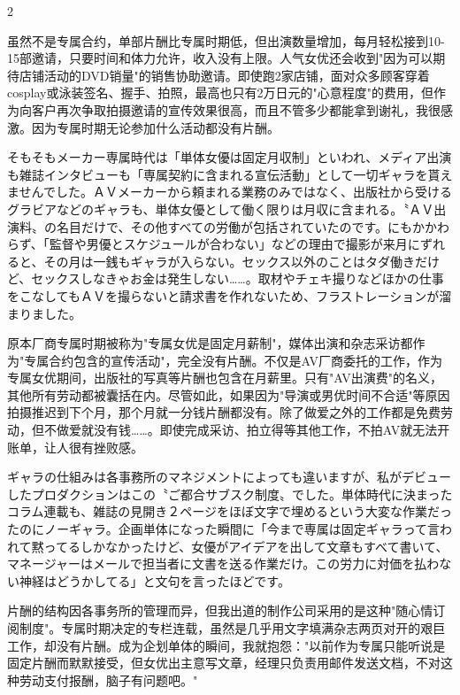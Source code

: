\documentclass[12pt,UTF8]{ctexbook}
\begin{document}
\begin{paracol}{2}
\switchcolumn

虽然不是专属合约，单部片酬比专属时期低，但出演数量增加，每月轻松接到10-15部邀请，只要时间和体力允许，收入没有上限。人气女优还会收到"因为可以期待店铺活动的DVD销量"的销售协助邀请。即使跑2家店铺，面对众多顾客穿着cosplay或泳装签名、握手、拍照，最高也只有2万日元的"心意程度"的费用，但作为向客户再次争取拍摄邀请的宣传效果很高，而且不管多少都能拿到谢礼，我很感激。因为专属时期无论参加什么活动都没有片酬。

\switchcolumn*

そもそもメーカー専属時代は「単体女優は固定月収制」といわれ、メディア出演も雑誌インタビューも「専属契約に含まれる宣伝活動」として一切ギャラを貰えませんでした。ＡＶメーカーから頼まれる業務のみではなく、出版社から受けるグラビアなどのギャラも、単体女優として働く限りは月収に含まれる。〝ＡＶ出演料〟の名目だけで、その他すべての労働が包括されていたのです。にもかかわらず、「監督や男優とスケジュールが合わない」などの理由で撮影が来月にずれると、その月は一銭もギャラが入らない。セックス以外のことはタダ働きだけど、セックスしなきゃお金は発生しない……。取材やチェキ撮りなどほかの仕事をこなしてもＡＶを撮らないと請求書を作れないため、フラストレーションが溜まりました。

\switchcolumn

原本厂商专属时期被称为"专属女优是固定月薪制"，媒体出演和杂志采访都作为"专属合约包含的宣传活动"，完全没有片酬。不仅是AV厂商委托的工作，作为专属女优期间，出版社的写真等片酬也包含在月薪里。只有"AV出演费"的名义，其他所有劳动都被囊括在内。尽管如此，如果因为"导演或男优时间不合适"等原因拍摄推迟到下个月，那个月就一分钱片酬都没有。除了做爱之外的工作都是免费劳动，但不做爱就没有钱……。即使完成采访、拍立得等其他工作，不拍AV就无法开账单，让人很有挫败感。

\switchcolumn*

ギャラの仕組みは各事務所のマネジメントによっても違いますが、私がデビューしたプロダクションはこの〝ご都合サブスク制度〟でした。単体時代に決まったコラム連載も、雑誌の見開き２ページをほぼ文字で埋めるという大変な作業だったのにノーギャラ。企画単体になった瞬間に「今まで専属は固定ギャラって言われて黙ってるしかなかったけど、女優がアイデアを出して文章もすべて書いて、マネージャーはメールで担当者に文書を送る作業だけ。この労力に対価を払わない神経はどうかしてる」と文句を言ったほどです。

\switchcolumn

片酬的结构因各事务所的管理而异，但我出道的制作公司采用的是这种"随心情订阅制度"。专属时期决定的专栏连载，虽然是几乎用文字填满杂志两页对开的艰巨工作，却没有片酬。成为企划单体的瞬间，我就抱怨："以前作为专属只能听说是固定片酬而默默接受，但女优出主意写文章，经理只负责用邮件发送文档，不对这种劳动支付报酬，脑子有问题吧。"


\end{paracol}
\end{document}
